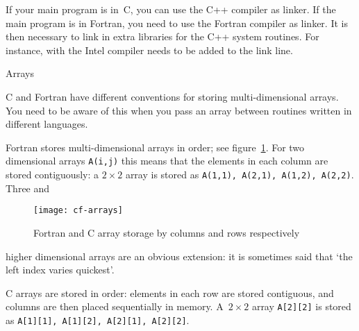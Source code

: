 If your main program is in~C, you can use the C++ compiler as linker.
If the main program is in Fortran, you need to use the Fortran
compiler as linker. It is then necessary to link in extra
libraries for the C++ system routines. For instance, with the 
Intel compiler  needs to be added to the link line.


 {Arrays}
\label{sec:CFarrays}

C and Fortran have different conventions for storing multi-dimensional
arrays. You need to be aware of this when you pass an array between
routines written in different languages. 

Fortran stores multi-dimensional arrays in 
order; see figure~\ref{fig:cf-arrays}.
For two dimensional arrays \texttt{A(i,j)} this means that
the elements in each column are stored contiguously: a $2\times2$
array is stored as \texttt{A(1,1), A(2,1), A(1,2), A(2,2)}. Three and
\begin{figure}[ht]
  \texttt{[image: cf-arrays]}
  \caption{Fortran and C array storage by columns and rows respectively}
  \label{fig:cf-arrays}
\end{figure}
higher dimensional arrays are an obvious extension: it is sometimes
said that `the left index varies quickest'.

C arrays are stored in  order: elements in each
row are stored contiguous, and columns are then placed sequentially in
memory. A~$2\times2$ array \texttt{A[2][2]} is stored as
\texttt{A[1][1], A[1][2], A[2][1], A[2][2]}. 

